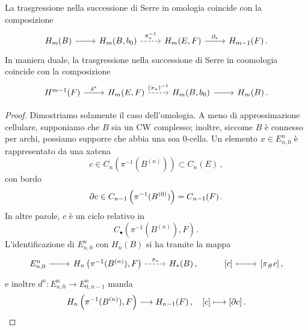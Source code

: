 \begin{thm}
	La trasgressione nella successione di Serre in omologia coincide con
	la composizione
	\begin{equation*}
		\begin{tikzcd}
			H_{m}(B) \ar[r]
			& H_{m}(B,b_{0}) \ar[r, dashed, "\pi_{*}^{-1}"]
			& H_{m}(E,F) \ar[r, "\de_{*}"]
			& H_{m-1}(F)\,.
		\end{tikzcd}
	\end{equation*}
	In maniera duale, 
	la trasgressione nella successione di Serre in coomologia coincide con
	la composizione
	\begin{equation*}
		\begin{tikzcd}
			H^{m-1}(F) \ar[r, "\delta^{*}"]
			& H_{m}(E,F) \ar[r, dashed, "(\pi_{*})^{-1}"]
			& H_{m}(B,b_{0}) \ar[r]
			& H_{m}(B)\,.
		\end{tikzcd}
	\end{equation*}
	\begin{proof}
		Dimostriamo solamente il caso dell'omologia.
		A meno di approssimazione cellulare, supponiamo che $B$ sia un CW complesso;
		inoltre, siccome $B$ è connesso per archi, possiamo supporre
		che abbia una soa $0$-cella.
		Un elemento $x \in E^{n}_{n,0}$ è rappresentato da una xatena
		\begin{equation*}
			c \in C_{n}\left( \pi^{-1}(B^{(n)}) \right) \subset C_{n}(E)\,,
		\end{equation*}
		con bordo
		\begin{equation*}
			\partial c \in C_{n-1}\left( \pi^{-1}(B^{(0)}) \right) 
			= C_{n-1}(F)\,.
		\end{equation*}
		In altre parole, $c$ è un ciclo relativo in
		\begin{equation*}
			C_{\bullet}\left( \pi^{-1}(B^{(n)}), F \right)\,.
		\end{equation*}
		L'identificazione di $E^{n}_{n,0}$ con $H_{n}(B)$
		si ha tramite la mappa
		\begin{equation*}
		\begin{tikzcd}
			E^{n}_{n,0} \ar[r]
			& H_{n}\left( \pi^{-1}(B^{(n)}), F \right) \ar[r, dashed, "\pi_{*}"]
			& H_{*}(B)\,,
			& {[c]} \ar[r, mapsto] & {[\pi_{\#}c]}\,,
		\end{tikzcd}
		\end{equation*}
		e inoltre $d^{n}:E^{n}_{n,0} \to E^{n}_{0,n-1}$ manda
		\begin{equation*}
			H_{n}\left( \pi^{-1}(B^{(n)}), F \right) 
			\longrightarrow H_{n-1}(F)\,, \quad
			{[c]} \longmapsto {[\partial c]}\,.
		\end{equation*}
	\end{proof}
\end{thm}





